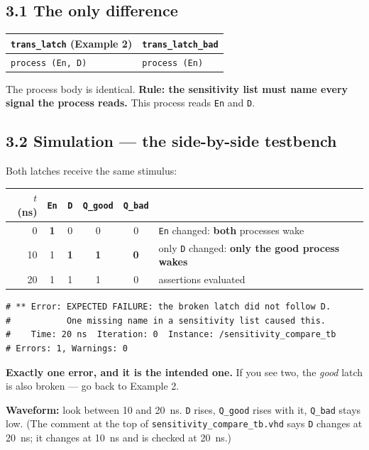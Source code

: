 \documentclass[11pt]{article}
\newcommand{\code}[1]{\texttt{#1}}
\begin{document}
\subsection*{3.1 The only difference}

\begin{center}
\begin{tabular}{ll}
\toprule
\code{trans\_latch} (Example 2) & \code{trans\_latch\_bad} \\
\midrule
\code{process (En, D)} & \code{process (En)} \\
\bottomrule
\end{tabular}
\end{center}

The process body is identical. \textbf{Rule: the sensitivity list must name every
signal the process reads.} This process reads \code{En} and \code{D}.

\subsection*{3.2 Simulation --- the side-by-side testbench}

Both latches receive the same stimulus:

\begin{center}
\begin{tabular}{r|cc|cc|l}
\toprule
$t$ (ns) & \code{En} & \code{D} & \code{Q\_good} & \code{Q\_bad} & \\
\midrule
0  & \textbf{1} & 0 & 0 & 0 & \code{En} changed: \textbf{both} processes wake \\
10 & 1 & \textbf{1} & \textbf{1} & \textbf{0} & only \code{D} changed: \textbf{only the good process wakes} \\
20 & 1 & 1 & 1 & 0 & assertions evaluated \\
\bottomrule
\end{tabular}
\end{center}

\begin{lstlisting}
# ** Error: EXPECTED FAILURE: the broken latch did not follow D.
#           One missing name in a sensitivity list caused this.
#    Time: 20 ns  Iteration: 0  Instance: /sensitivity_compare_tb
# Errors: 1, Warnings: 0
\end{lstlisting}

\textbf{Exactly one error, and it is the intended one.} If you see two, the
\emph{good} latch is also broken --- go back to Example 2.

\textbf{Waveform:} look between 10 and 20~ns. \code{D} rises, \code{Q\_good} rises
with it, \code{Q\_bad} stays low. (The comment at the top of
\code{sensitivity\_compare\_tb.vhd} says \code{D} changes at 20~ns; it changes at
10~ns and is checked at 20~ns.)
\end{document}
